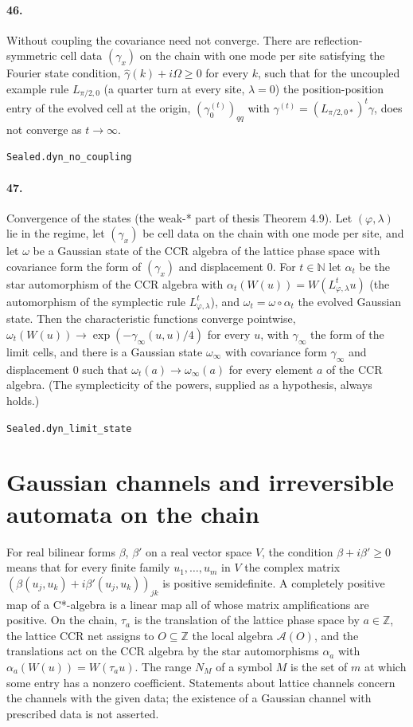 \documentclass[11pt]{article}
\begin{document}
\paragraph{46.} Without coupling the covariance need not converge. There are reflection-symmetric cell data $(\gamma_x)$ on the chain with one mode per site satisfying the Fourier state condition, $\hat\gamma(k) + i\Omega \ge 0$ for every $k$, such that for the uncoupled example rule $L_{\pi/2, 0}$ (a quarter turn at every site, $\lambda = 0$) the position-position entry of the evolved cell at the origin, $(\gamma^{(t)}_0)_{qq}$ with $\gamma^{(t)} = (L_{\pi/2, 0*})^t\gamma$, does not converge as $t \to \infty$.\par{\footnotesize\texttt{Sealed.dyn\_no\_coupling}}

\paragraph{47.} Convergence of the states (the weak-* part of thesis Theorem 4.9). Let $(\varphi, \lambda)$ lie in the regime, let $(\gamma_x)$ be cell data on the chain with one mode per site, and let $\omega$ be a Gaussian state of the CCR algebra of the lattice phase space with covariance form the form of $(\gamma_x)$ and displacement $0$. For $t \in \mathbb N$ let $\alpha_t$ be the star automorphism of the CCR algebra with $\alpha_t(W(u)) = W(L_{\varphi, \lambda}^t u)$ (the automorphism of the symplectic rule $L^t_{\varphi, \lambda}$), and $\omega_t = \omega \circ \alpha_t$ the evolved Gaussian state. Then the characteristic functions converge pointwise, $\omega_t(W(u)) \to \exp(-\gamma_\infty(u, u)/4)$ for every $u$, with $\gamma_\infty$ the form of the limit cells, and there is a Gaussian state $\omega_\infty$ with covariance form $\gamma_\infty$ and displacement $0$ such that $\omega_t(a) \to \omega_\infty(a)$ for every element $a$ of the CCR algebra. (The symplecticity of the powers, supplied as a hypothesis, always holds.)\par{\footnotesize\texttt{Sealed.dyn\_limit\_state}}

\section*{Gaussian channels and irreversible automata on the chain}
For real bilinear forms $\beta$, $\beta'$ on a real vector space $V$, the condition $\beta + i\beta' \ge 0$ means that for every finite family $u_1, \dots, u_m$ in $V$ the complex matrix $(\beta(u_j, u_k) + i\beta'(u_j, u_k))_{jk}$ is positive semidefinite. A completely positive map of a C*-algebra is a linear map all of whose matrix amplifications are positive. On the chain, $\tau_a$ is the translation of the lattice phase space by $a \in \mathbb Z$, the lattice CCR net assigns to $O \subseteq \mathbb Z$ the local algebra $\mathcal A(O)$, and the translations act on the CCR algebra by the star automorphisms $\alpha_a$ with $\alpha_a(W(u)) = W(\tau_a u)$. The range $N_M$ of a symbol $M$ is the set of $m$ at which some entry has a nonzero coefficient. Statements about lattice channels concern the channels with the given data; the existence of a Gaussian channel with prescribed data is not asserted.
\end{document}
